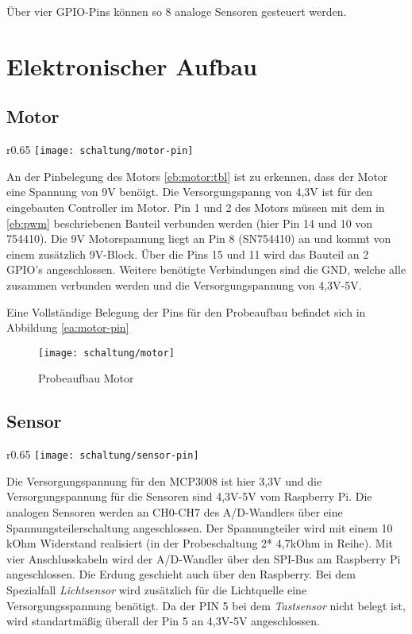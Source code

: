 Über vier GPIO-Pins können so 8 analoge Sensoren gesteuert werden.

\section{Elektronischer Aufbau}

\subsection{Motor}
\begin{wrapfigure}{r}{0.65\textwidth}
\texttt{[image: schaltung/motor-pin]}
\caption{GPIO Belegung Motor}
\label{ea:motor-pin}
\end{wrapfigure}
An der Pinbelegung des Motors \ref{eb:motor:tbl} ist zu erkennen, dass der Motor eine Spannung von 9V benöigt. Die Versorgungspanng von 4,3V ist für den eingebauten Controller im Motor. Pin 1 und 2 des Motors müssen mit dem in \ref{eb:pwm} beschriebenen Bauteil verbunden werden (hier Pin 14 und 10 von 754410). Die 9V Motorspannung liegt an Pin 8 (SN754410) an und kommt von einem zusätzlich 9V-Block. Über die Pins 15 und 11 wird das Bauteil an 2 GPIO's angeschlossen. Weitere benötigte Verbindungen sind die GND, welche alle zusammen verbunden werden und die Versorgungspannung von 4,3V-5V.

Eine Vollständige Belegung der Pins für den Probeaufbau befindet sich in Abbildung \ref{ea:motor-pin}

\begin{figure}[h]
  \centering
  \texttt{[image: schaltung/motor]}
  \caption{Probeaufbau Motor}
  \label{schaltung:motor}
\end{figure}

\subsection{Sensor}
\begin{wrapfigure}{r}{0.65\textwidth}
\texttt{[image: schaltung/sensor-pin]}
\caption{GPIO Belegung Sensor}
\label{ea:sensor-pin}
\end{wrapfigure}

Die Versorgungspannung für den MCP3008 ist hier 3,3V und die Versorgungspannung für die Sensoren sind 4,3V-5V vom Raspberry Pi. Die analogen Sensoren werden an CH0-CH7 des A/D-Wandlers über eine Spannungsteilerschaltung angeschlossen. Der Spannungteiler wird mit einem 10 kOhm Widerstand realisiert (in der Probeschaltung 2* 4,7kOhm in Reihe). Mit vier Anschlusskabeln wird der A/D-Wandler über den SPI-Bus am Raspberry Pi angeschlossen. Die Erdung geschieht auch über den Raspberry. Bei dem Spezialfall \emph{Lichtsensor} wird zusätzlich für die Lichtquelle eine Versorgungsspannung benötigt. Da der PIN 5 bei dem \emph{Tastsensor} nicht belegt ist, wird standartmäßig überall der Pin 5 an 4,3V-5V angeschlossen.

